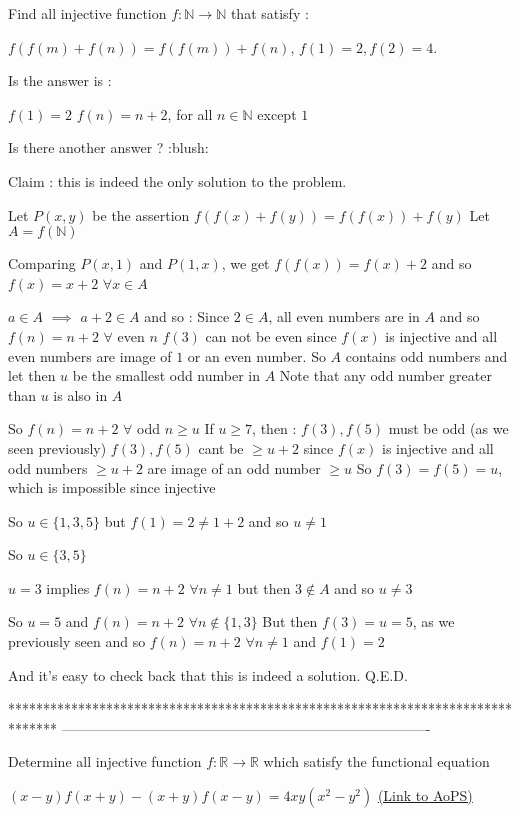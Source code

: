 \begin{solution}
	\begin{tcolorbox}Find all injective function $f : \mathbb{N} \rightarrow \mathbb{N}$ that satisfy :

$f(f(m) + f(n)) = f(f(m)) + f(n)$, $f(1) = 2, f(2) = 4$.

Is the answer is :

$f(1) = 2$
$f(n) = n + 2$, for all $n \in \mathbb{N}$ except $1$

Is there another answer ? :blush:\end{tcolorbox}
Claim : this is indeed the only solution to the problem.

Let $P(x,y)$ be the assertion $f(f(x)+f(y))=f(f(x))+f(y)$
Let $A=f(\mathbb N)$

Comparing $P(x,1)$ and $P(1,x)$, we get $f(f(x))=f(x)+2$ and so $f(x)=x+2$ $\forall x\in A$

$a\in A$ $\implies$ $a+2\in A$ and so :
Since $2\in A$, all even numbers are in $A$ and so $f(n)=n+2$ $\forall $ even $n$
$f(3)$ can not be even since $f(x)$ is injective and all even numbers are image of $1$ or an even number.
So $A$ contains odd numbers and let then $u$ be the smallest odd number in $A$
Note that any odd number greater than $u$ is also in $A$

So $f(n)=n+2$ $\forall$ odd $n\ge u$
If $u\ge 7$, then :
$f(3),f(5)$ must be odd (as we seen previously)
$f(3),f(5)$ cant be $\ge u+2$ since $f(x)$ is injective and all odd numbers $\ge u+2$ are image of an odd number $\ge u$
So $f(3)=f(5)=u$, which is impossible since injective

So $u\in\{1,3,5\}$ but $f(1)=2\ne 1+2$ and so $u\ne 1$

So $u\in\{3,5\}$

$u=3$ implies $f(n)=n+2$ $\forall n\ne 1$ but then $3\notin A$ and so $u\ne 3$

So $u=5$ and $f(n)=n+2$ $\forall n\notin\{1,3\}$
But then $f(3)=u=5$, as we previously seen 
and so $f(n)=n+2$ $\forall n\ne 1$ and $f(1)=2$

And it's easy to check back that this is indeed a solution.
Q.E.D.
\end{solution}
*******************************************************************************
-------------------------------------------------------------------------------

\begin{problem}
	Determine all injective function  $f : \mathbb{R} \rightarrow \mathbb{R}$ which satisfy the functional equation 

$(x - y)f(x+y) - (x+y)f(x-y) = 4xy(x^2-y^2)$
	\flushright \href{https://artofproblemsolving.com/community/c6h484811}{(Link to AoPS)}
\end{problem}



